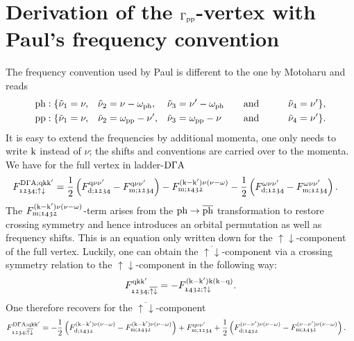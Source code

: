 \documentclass[main.tex]{subfiles}
\begin{document}
\newpage

\section{Derivation of the $\Gamma_{\text{pp}}$-vertex with Paul's frequency convention}

The frequency convention used by Paul is different to the one by Motoharu and reads
\begin{subequations}
\begin{align}
	&\text{ph}: \{\tilde\nu_1=\nu,&&\tilde\nu_2=\nu-\omega_{\text{ph}},&&\tilde\nu_3=\nu'-\omega_{\text{ph}}\qquad\text{and}\qquad&&\tilde\nu_4=\nu' \}, \\
	&\text{pp}: \{\tilde\nu_1=\nu,&&\tilde\nu_2=\omega_{\text{pp}}-\nu',&&\tilde\nu_3=\omega_{\text{pp}}-\nu\phantom{'}\qquad\text{and}\qquad&&\tilde\nu_4=\nu' \}.
\end{align}
\end{subequations}
It is easy to extend the frequencies by additional momenta, one only needs to write $\text{k}$ instead of $\nu$; the shifts and conventions are carried over to the momenta. We have for the full vertex in ladder-$\text{D}\Gamma\text{A}$ \cite{anna galler thesis, rohringer thesis}
\begin{align}
	F^{\text{D}\Gamma\text{A};\text{q}\text{k}\text{k}'}_{\mathfrak{1234};\uparrow\downarrow}&=\frac12\left (F_{\text{d};\mathfrak{1234}}^{\text{q}\nu\nu'}-F_{\text{m};\mathfrak{1234}}^{\text{q}\nu\nu'}\right )-F_{\text{m};\mathfrak{1432}}^{(\text{k}-\text{k}')\nu(\nu-\omega)}-\frac12\left (F_{\text{d};\mathfrak{1234}}^{\omega\nu\nu'}-F_{\text{m};\mathfrak{1234}}^{\omega\nu\nu'}\right ).
\end{align}
The $F_{\text{m};\mathfrak{1432}}^{(\text{k}-\text{k}')\nu(\nu-\omega)}$-term arises from the $\text{ph}\to\overline{\text{ph}}$ transformation to restore crossing symmetry and hence introduces an orbital permutation as well as frequency shifts. This is an equation only written down for the $\uparrow\downarrow$-component of the full vertex. Luckily, one can obtain the $\overline{\uparrow\downarrow}$-component via a crossing symmetry relation to the $\uparrow\downarrow$-component in the following way:
\begin{align}
	F^{\text{q}\text{k}\text{k}'}_{\mathfrak{1234};\overline{\uparrow\downarrow}}=-F^{(\text{k}-\text{k}')\text{k}(\text{k}-\text{q})}_{\mathfrak{1432};\uparrow\downarrow}.
\end{align}
One therefore recovers for the $\overline{\uparrow\downarrow}$-component
\begin{align}
	F^{\text{D}\Gamma\text{A};\text{q}\text{k}\text{k}'}_{\mathfrak{1234};\overline{\uparrow\downarrow}}&=-\frac12\left (F_{\text{d};\mathfrak{1432}}^{(\text{k}-\text{k}')\nu(\nu-\omega)}-F_{\text{m};\mathfrak{1432}}^{(\text{k}-\text{k}')\nu(\nu-\omega)}\right )+F_{\text{m};\mathfrak{1234}}^{\text{q}\nu\nu'}+\frac12\left (F_{\text{d};\mathfrak{1432}}^{(\nu-\nu')\nu(\nu-\omega)}-F_{\text{m};\mathfrak{1432}}^{(\nu-\nu')\nu(\nu-\omega)}\right ).
\end{align}
\end{document}
